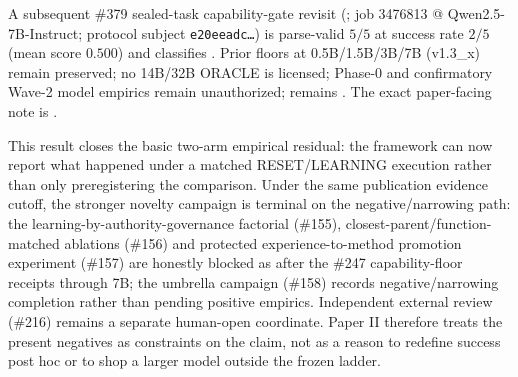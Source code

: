 \begin{sloppypar}
A subsequent \#379 sealed-task capability-gate revisit (; job 3476813 @ Qwen2.5-7B-Instruct; protocol subject \texttt{e20eeadc\ldots}) is parse-valid $5/5$ at success rate $2/5$ (mean score $0.500$) and classifies .  Prior floors at 0.5B/1.5B/3B/7B (v1.3\_x) remain preserved; no 14B/32B ORACLE is licensed; Phase-0 and confirmatory Wave-2 model empirics remain unauthorized;  remains .  The exact paper-facing note is
.
\end{sloppypar}


This result closes the basic two-arm empirical residual: the framework can now report what happened under a matched RESET/LEARNING execution rather than only preregistering the comparison.  Under the same publication evidence cutoff, the stronger novelty campaign is terminal on the negative/narrowing path: the learning-by-authority-governance factorial (\#155), closest-parent/function-matched ablations (\#156) and protected experience-to-method promotion experiment (\#157) are honestly blocked as  after the \#247 capability-floor receipts through 7B; the umbrella campaign (\#158) records negative/narrowing completion rather than pending positive empirics.  Independent external review (\#216) remains a separate human-open coordinate.  Paper II therefore treats the present negatives as constraints on the claim, not as a reason to redefine success post hoc or to shop a larger model outside the frozen ladder.
